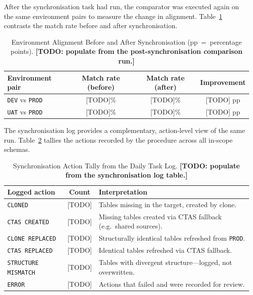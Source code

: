 After the synchronisation task had run, the comparator was executed again on the same environment pairs to measure the change in alignment. Table~\ref{tab:before-after} contrasts the match rate before and after synchronisation.

\begin{table}[H]
  \centering
  \begin{tabularx}{\textwidth}{X c c c}
    \toprule
    \rowcolor{ibmblue!15}
    \textbf{Environment pair} & \textbf{Match rate (before)} & \textbf{Match rate (after)} & \textbf{Improvement} \\
    \midrule
    \texttt{DEV} vs \texttt{PROD} & [TODO]\% & [TODO]\% & [TODO] pp \\
    \texttt{UAT} vs \texttt{PROD} & [TODO]\% & [TODO]\% & [TODO] pp \\
    \bottomrule
  \end{tabularx}
  \caption{Environment Alignment Before and After Synchronisation (pp~=~percentage points). \textbf{[TODO: populate from the post-synchronisation comparison run.]}}
  \label{tab:before-after}
\end{table}

The synchronisation log provides a complementary, action-level view of the same run. Table~\ref{tab:synclog} tallies the actions recorded by the procedure across all in-scope schemas.

\begin{table}[H]
  \centering
  \begin{tabularx}{\textwidth}{l c X}
    \toprule
    \rowcolor{ibmblue!15}
    \textbf{Logged action} & \textbf{Count} & \textbf{Interpretation} \\
    \midrule
    \texttt{CLONED}            & [TODO] & Tables missing in the target, created by clone. \\
    \texttt{CTAS CREATED}      & [TODO] & Missing tables created via CTAS fallback (e.g.\ shared sources). \\
    \texttt{CLONE REPLACED}    & [TODO] & Structurally identical tables refreshed from \texttt{PROD}. \\
    \texttt{CTAS REPLACED}     & [TODO] & Identical tables refreshed via CTAS fallback. \\
    \texttt{STRUCTURE MISMATCH}& [TODO] & Tables with divergent structure---logged, not overwritten. \\
    \texttt{ERROR}             & [TODO] & Actions that failed and were recorded for review. \\
    \bottomrule
  \end{tabularx}
  \caption{Synchronisation Action Tally from the Daily Task Log. \textbf{[TODO: populate from the synchronisation log table.]}}
  \label{tab:synclog}
\end{table}

